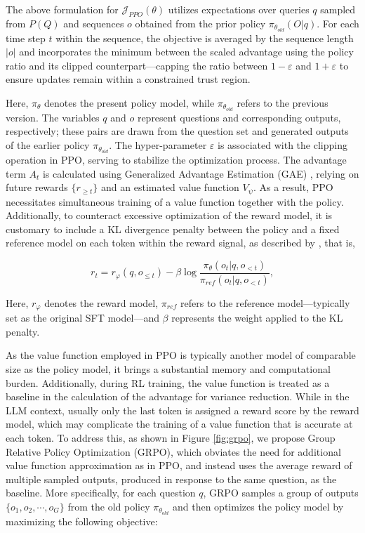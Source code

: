 \begin{itemize}[topsep=0pt]
\begin{itemize}[topsep=0pt]
The above formulation for $\mathcal{J}_{PPO}(\theta)$ utilizes expectations over queries $q$ sampled from $P(Q)$ and sequences $o$ obtained from the prior policy $\pi_{\theta_{old}}(O|q)$. For each time step $t$ within the sequence, the objective is averaged by the sequence length $|o|$ and incorporates the minimum between the scaled advantage using the policy ratio and its clipped counterpart—capping the ratio between $1-\varepsilon$ and $1+\varepsilon$ to ensure updates remain within a constrained trust region.

Here, $\pi_{\theta}$ denotes the present policy model, while $\pi_{\theta_{old}}$ refers to the previous version. The variables $q$ and $o$ represent questions and corresponding outputs, respectively; these pairs are drawn from the question set and generated outputs of the earlier policy $\pi_{\theta_{old}}$. The hyper-parameter $\varepsilon$ is associated with the clipping operation in PPO, serving to stabilize the optimization process. The advantage term $A_t$ is calculated using Generalized Advantage Estimation (GAE) \citep{gae}, relying on future rewards $\{r_{\ge t}\}$ and an estimated value function $V_{\psi}$. As a result, PPO necessitates simultaneous training of a value function together with the policy. Additionally, to counteract excessive optimization of the reward model, it is customary to include a KL divergence penalty between the policy and a fixed reference model on each token within the reward signal, as described by \citep{ouyang2022training}, that is,

\begin{equation}
    r_{t} = r_\varphi(q, o_{\le t}) - \beta \log\frac{\pi_{\theta}(o_{t}|q, o_{<t})}{\pi_{ref}(o_{t}|q, o_{<t})},
\label{eq:PPO-reward}
\end{equation}

Here, $r_\varphi$ denotes the reward model, $\pi_{ref}$ refers to the reference model—typically set as the original SFT model—and $\beta$ represents the weight applied to the KL penalty.

As the value function employed in PPO is typically another model of comparable size as the policy model, it brings a substantial memory and computational burden. Additionally, during RL training, the value function is treated as a baseline in the calculation of the advantage for variance reduction. While in the LLM context, usually only the last token is assigned a reward score by the reward model, which may complicate the training of a value function that is accurate at each token. To address this, as shown in Figure \ref{fig:grpo}, we propose Group Relative Policy Optimization (GRPO), which obviates the need for additional value function approximation as in PPO, and instead uses the average reward of multiple sampled outputs, produced in response to the same question, as the baseline. More specifically, for each question $q$, GRPO samples a group of outputs $\{o_1, o_2, \cdots, o_G\}$  from the old policy  $\pi_{\theta_{old}}$  and then optimizes the policy model by maximizing the following objective:


\end{itemize}
\end{itemize}
